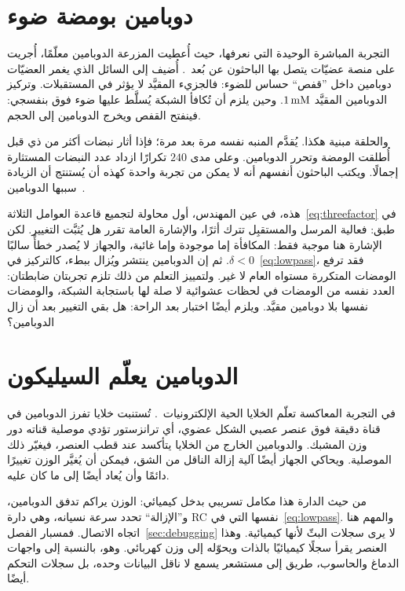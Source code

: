 \section{دوبامين بومضة ضوء}
\label{sec:dishdopamine}

التجربة المباشرة الوحيدة التي نعرفها، حيث أُعطيت المزرعة الدوبامين معلّمًا، أُجريت على منصة عضيّات يتصل بها الباحثون عن بُعد~\cite{Jordan2024}. أُضيف إلى السائل الذي يغمر العضيّات دوبامين داخل ”قفص“ حساس للضوء: فالجزيء المقيَّد لا يؤثر في المستقبلات. وتركيز الدوبامين المقيَّد $1\,\text{mM}$. وحين يلزم أن تُكافأ الشبكة يُسلَّط عليها ضوء فوق بنفسجي: فينفتح القفص ويخرج الدوبامين إلى الحجم.

والحلقة مبنية هكذا. يُقدَّم المنبه نفسه مرة بعد مرة؛ فإذا أثار نبضات أكثر من ذي قبل أُطلقت الومضة وتحرر الدوبامين. وعلى مدى $240$ تكرارًا ازداد عدد النبضات المستثارة إجمالًا. ويكتب الباحثون أنفسهم أنه لا يمكن من تجربة واحدة كهذه أن يُستنتج أن الزيادة سببها الدوبامين~\cite{Jordan2024}.

هذه، في عين المهندس، أول محاولة لتجميع قاعدة العوامل الثلاثة~\eqref{eq:threefactor} في طبق: فعالية المرسل والمستقبِل تترك أثرًا، والإشارة العامة تقرر هل يُثبَّت التغيير. لكن الإشارة هنا موجبة فقط: المكافأة إما موجودة وإما غائبة، والجهاز لا يُصدر خطأً سالبًا $\delta<0$. ثم إن الدوبامين ينتشر ويُزال ببطء، كالتركيز في~\eqref{eq:lowpass}، فقد ترفع الومضات المتكررة مستواه العام لا غير. ولتمييز التعلم من ذلك تلزم تجربتان ضابطتان: العدد نفسه من الومضات في لحظات عشوائية لا صلة لها باستجابة الشبكة، والومضات نفسها بلا دوبامين مقيَّد. ويلزم أيضًا اختبار بعد الراحة: هل بقي التغيير بعد أن زال الدوبامين؟

\section{الدوبامين يعلّم السيليكون}
\label{sec:biohybrid}

في التجربة المعاكسة تعلّم الخلايا الحية الإلكترونيات~\cite{Keene2020}. تُستنبت خلايا تفرز الدوبامين في قناة دقيقة فوق عنصر عصبي الشكل عضوي، أي ترانزستور تؤدي موصلية قناته دور وزن المشبك. والدوبامين الخارج من الخلايا يتأكسد عند قطب العنصر، فيغيّر ذلك الموصلية. ويحاكي الجهاز أيضًا آلية إزالة الناقل من الشق، فيمكن أن يُغيَّر الوزن تغييرًا دائمًا وأن يُعاد أيضًا إلى ما كان عليه.

من حيث الدارة هذا مكامل تسريبي بدخل كيميائي: الوزن يراكم تدفق الدوبامين، و”الإزالة“ تحدد سرعة نسيانه، وهي دارة \foreignlanguage{english}{RC} نفسها التي في~\eqref{eq:lowpass}. والمهم هنا اتجاه الاتصال. فمسبار الفصل~\ref{sec:debugging} لا يرى سجلات البثّ لأنها كيميائية. وهذا العنصر يقرأ سجلًا كيميائيًا بالذات ويحوّله إلى وزن كهربائي. وهو، بالنسبة إلى واجهات الدماغ والحاسوب، طريق إلى مستشعر يسمع لا ناقل البيانات وحده، بل سجلات التحكم أيضًا.

